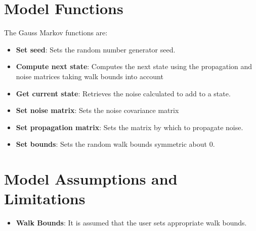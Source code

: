 \section{Model Functions}
The Gauss Markov functions are:
\begin{itemize}
	\item \textbf{Set seed}: Sets the random number generator seed.
	\item \textbf{Compute next state}: Computes the next state using the propagation and noise matrices taking walk bounds into account
	\item \textbf{Get current state}: Retrieves the noise calculated to add to a state.
	\item \textbf{Set noise matrix}: Sets the noise covariance matrix
	\item \textbf{Set propagation matrix}: Sets the matrix by which to propagate noise.
	\item \textbf{Set bounds}: Sets the random walk bounds symmetric about 0.
\end{itemize}


\section{Model Assumptions and Limitations}
\begin{itemize}
	\item \textbf{Walk Bounds}: It is assumed that the user sets appropriate walk bounds.
\end{itemize}
